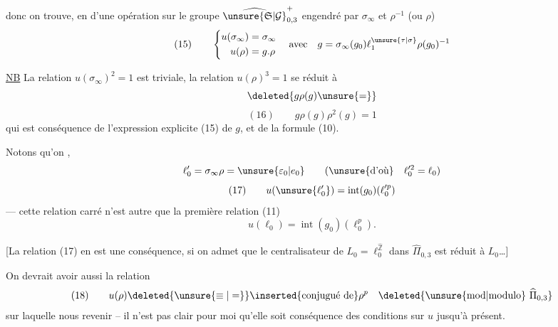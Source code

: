 donc on trouve, en  d'une opération sur le groupe $\widehat{\unsure{\mathfrak S|\mathcal G}}_{0,3}^{+}$ engendré par $\sigma_\infty$ et $\rho^{-1}$ (ou $\rho$)
\[
(15)\qquad
\left\{
\begin{aligned}
u(\sigma_\infty)&=\sigma_\infty\\
u(\rho)&=g.\rho
\end{aligned}
\right.
\quad\text{avec}\quad
 g=\sigma_\infty(g_0)\ell_1^{\unsure{\tau|\sigma}}\rho(g_0)^{-1}
\]


\uline{NB} La relation  $u(\sigma_\infty)^2=1$ est triviale, la relation $u(\rho)^3=1$ se réduit à
\[
\deleted{g\rho(g)\unsure{=}}
\]
\[
(16)\qquad g\rho(g)\rho^2(g)=1
\]
qui est conséquence de l'expression explicite (15) de $g$, et de la formule (10).

Notons qu'on  ,  
\[
\ell'_0=\sigma_\infty\rho=\unsure{\varepsilon_0|e_0}\qquad
(\text{\unsure{d'où}}\quad \ell_0^{\prime 2}=\ell_0)
\]
\[
(17)\qquad
u(\unsure{\ell'_0})
=\operatorname{int}(g_0)(\ell_0^{\prime p})
\]
--- cette relation  carré n'est autre que la première relation (11)
\[
u(\ell_0)=\operatorname{int}(g_0)(\ell_0^p).
\]

[La relation (17) en est une conséquence, si on admet que le centralisateur de $L_0=\ell_0^{\widehat{\mathbb Z}}$ dans $\widehat{\Pi}_{0,3}$ est réduit à $L_0$\dots]

On devrait avoir aussi la relation
\[
(18)\qquad u(\rho)\deleted{\unsure{\equiv|=}}\inserted{\text{conjugué de}}\rho^p
\quad\deleted{\text{\unsure{mod|modulo}}\ \widehat{\Pi}_{0,3}}
\]
 sur laquelle nous  revenir -- il n'est pas clair pour moi qu'elle soit conséquence des conditions  sur $u$ jusqu'à présent.
